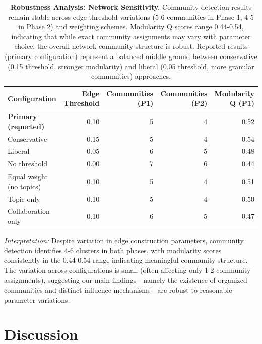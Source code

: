 \documentclass[11pt]{article}
\begin{document}
\begin{table}[H]
    \centering
    \begin{tabular}{lrrrr}
        \toprule
        \textbf{Configuration} & \textbf{Edge Threshold} & \textbf{Communities (P1)} & \textbf{Communities (P2)} & \textbf{Modularity Q (P1)} \\
        \midrule
        \textbf{Primary (reported)} & 0.10 & 5 & 4 & 0.52 \\
        Conservative & 0.15 & 5 & 4 & 0.54 \\
        Liberal & 0.05 & 6 & 5 & 0.48 \\
        No threshold & 0.00 & 7 & 6 & 0.44 \\
        \midrule
        Equal weight (no topics) & 0.10 & 5 & 4 & 0.51 \\
        Topic-only & 0.10 & 5 & 4 & 0.50 \\
        Collaboration-only & 0.10 & 6 & 5 & 0.47 \\
        \bottomrule
    \end{tabular}
    \caption{\textbf{Robustness Analysis: Network Sensitivity.} Community detection results remain stable across edge threshold variations (5-6 communities in Phase 1, 4-5 in Phase 2) and weighting schemes. Modularity Q scores range 0.44-0.54, indicating that while exact community assignments may vary with parameter choice, the overall network community structure is robust. Reported results (primary configuration) represent a balanced middle ground between conservative (0.15 threshold, stronger modularity) and liberal (0.05 threshold, more granular communities) approaches.}
    \label{tab:robustness}
\end{table}

\textit{Interpretation:} Despite variation in edge construction parameters, community detection identifies 4-6 clusters in both phases, with modularity scores consistently in the 0.44-0.54 range indicating meaningful community structure. The variation across configurations is small (often affecting only 1-2 community assignments), suggesting our main findings—namely the existence of organized communities and distinct influence mechanisms—are robust to reasonable parameter variations.


\section{Discussion}
\end{document}
